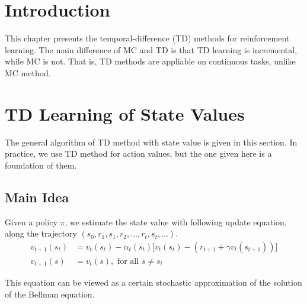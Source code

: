 \section{Introduction}
    This chapter presents the temporal-difference (TD) methods for reinforcement learning.
    The main difference of MC and TD is that TD learning is incremental, while MC is not.
    That is, TD methods are appliable on continuous tasks, unlike MC method.
\section{TD Learning of State Values}
    The general algorithm of TD method with state value is given in this section.
    In practice, we use TD method for action values, but the one given here is a foundation of
    them.

    \subsection{Main Idea}
    Given a policy $\pi$, we estimate the state value with following update equation, along the trajectory
    $(s_0,r_1,s_1,r_2,\dots,r_t, s_t, \dots)$.
    \begin{align}
        v_{t+1}(s_t) &= v_t(s_t) - \alpha_t(s_t)\Big[ v_t(s_t) - (r_{t+1} + \gamma v_t(s_{t+1})) \Big] \label{eq:TDUpdate}\\
        v_{t+1}(s) &= v_t(s), \text{ for all } s \neq s_t
    \end{align}

    This equation can be viewed as a certain stochastic approximation of the solution of the Bellman equation.

